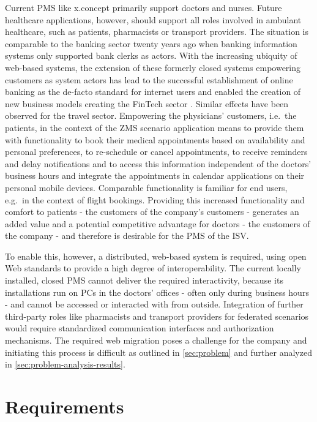 Current PMS like x.concept primarily support doctors and nurses.
Future healthcare applications, however, should support all roles involved in ambulant healthcare, such as patients, pharmacists or transport providers.
The situation is comparable to the banking sector twenty years ago when banking information systems only supported bank clerks as actors.
With the increasing ubiquity of web-based systems, the extension of these formerly closed systems empowering customers as system actors has lead to the successful establishment of online banking as the de-facto standard for internet users \autocite{BitkomResearch2016DigitalBanking} and enabled the creation of new business models creating the FinTech sector \autocite{Schueffel2016FinTech}.
Similar effects have been observed for the travel sector.
Empowering the physicians' customers, i.e.~the patients, in the context of the ZMS scenario application means to provide them with functionality to book their medical appointments based on availability and personal preferences, to re-schedule or cancel appointments, to receive reminders and delay notifications and to access this information independent of the doctors' business hours and integrate the appointments in calendar applications on their personal mobile devices.
Comparable functionality is familiar for end users, e.g.~in the context of flight bookings.
Providing this increased functionality and comfort to patients - the customers of the company's customers - generates an added value and a potential competitive advantage for doctors - the customers of the company - and therefore is desirable for the PMS of the ISV.

To enable this, however, a distributed, web-based system is required, using open Web standards to provide a high degree of interoperability.
The current locally installed, closed PMS cannot deliver the required interactivity, because its installations run on PCs in the doctors' offices - often only during business hours - and cannot be accessed or interacted with from outside.
Integration of further third-party roles like pharmacists and transport providers for federated scenarios would require standardized communication interfaces and authorization mechanisms.
The required web migration poses a challenge for the company and initiating this process is difficult as outlined in \cref{sec:problem} and further analyzed in \cref{sec:problem-analysis-results}.

\hypertarget{sec:requirements}{%
\section{Requirements}\label{sec:requirements}}

